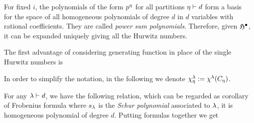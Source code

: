 \documentclass[10pt,handout]{beamer} %
\begin{document}
\begin{frame}

For fixed $i$, the polynomials of the form $p^\eta$ for all partitions $\eta\vdash d$ form a basis for the space of all homogeneous polynomials of degree $d$ in $d$ variables with rational coefficients. They are called \emph{power sum polynomials}. Therefore, given $\mathfrak H^\bullet$, it can be expanded uniquely giving all the Hurwitz numbers. \pause

\vspace{\baselineskip}

The first advantage of considering generating function in place of the single Hurwitz numbers is 

\begin{theorem}
	\vspace{-5pt}
\end{theorem}

\end{frame}

\begin{frame}

In order to simplify the notation, in the following we denote $\chi^\lambda_\eta:=\chi^\lambda(C_\eta)$. \pause

For any $\lambda\vdash d$, we have the following relation, which can be regarded as corollary of Frobenius formula
where $s_\lambda$ is the \emph{Schur polynomial} associated to $\lambda$, it is homogeneous polynomial of degree $d$. \pause Putting formulas together we get

\end{frame}
\end{document}
